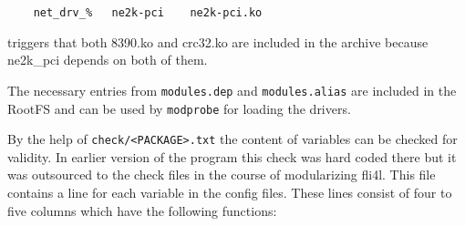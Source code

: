 \begin{example}
\begin{verbatim}
    net_drv_%   ne2k-pci    ne2k-pci.ko
\end{verbatim}
\end{example}

triggers that both 8390.ko and crc32.ko are included in the archive
because ne2k\_pci depends on both of them.

The necessary entries from \texttt{modules.dep} and \texttt{modules.alias}
are included in the RootFS and can be used by \texttt{modprobe} for
loading the drivers.


By the help of \texttt{check/<PACKAGE>.txt} the content of variables can be
checked for validity. In earlier version of the program  this
check was hard coded there but it was outsourced to the check files in
the course of modularizing fli4l. This file contains a line for each
variable in the config files. These lines consist of four to five columns
which have the following functions:

